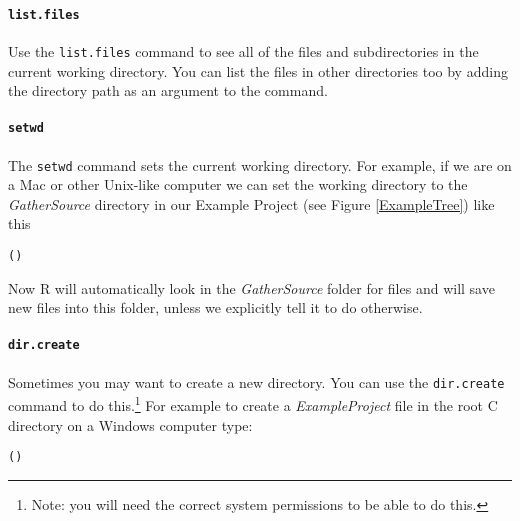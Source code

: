 \paragraph{{\tt{list.files}}}

Use the \texttt{list.files} command to see all of the files and subdirectories in the current working directory. You can list the files in other directories too by adding the directory path as an argument to the command.  

\paragraph{{\tt{setwd}}}

The {\tt{setwd}} command sets the current working directory. For example, if we are on a Mac or other Unix-like computer we can set the working directory to the {\emph{GatherSource}} directory in our Example Project (see Figure \ref{ExampleTree}) like this

\begin{knitrout}
\color{fgcolor}\begin{kframe}
\begin{alltt}
()
\end{alltt}
\end{kframe}
\end{knitrout}


\noindent Now R will automatically look in the {\emph{GatherSource}} folder for files and will save new files into this folder, unless we explicitly tell it to do otherwise.

\paragraph{{\tt{dir.create}}}

Sometimes you may want to create a new directory. You can use the {\tt{dir.create}} command to do this.\footnote{Note: you will need the correct system permissions to be able to do this.} For example to create a {\emph{ExampleProject}} file in the root C directory on a Windows computer type:

\begin{knitrout}
\color{fgcolor}\begin{kframe}
\begin{alltt}
()
\end{alltt}
\end{kframe}
\end{knitrout}


